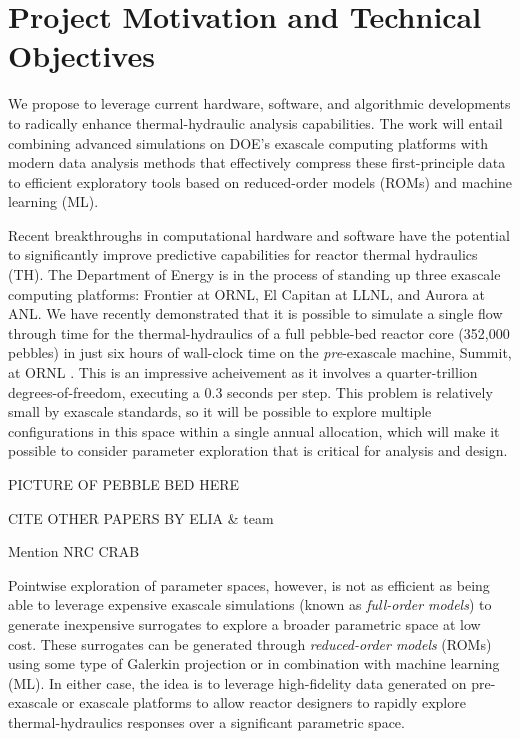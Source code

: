 \section{Project Motivation and Technical Objectives}

We propose to leverage current hardware, software, and algorithmic developments
to radically enhance thermal-hydraulic analysis capabilities.  The work will
entail combining advanced simulations on DOE's exascale computing platforms
with modern data analysis methods that effectively compress these
first-principle data to efficient exploratory tools based on reduced-order
models (ROMs) and machine learning (ML).

Recent breakthroughs in computational hardware and software have the potential
to significantly improve predictive capabilities for reactor thermal hydraulics
(TH).  The Department of Energy is in the process of standing up three exascale
computing platforms: Frontier at ORNL, El Capitan at LLNL, and Aurora at ANL.
We have recently demonstrated that it is possible to simulate a single flow
through time for the thermal-hydraulics of a full pebble-bed reactor core
(352,000 pebbles) in just six hours of wall-clock time on the {\em
pre}-exascale machine, Summit, at ORNL \cite{sc22}.   This is an impressive
acheivement as it involves a quarter-trillion degrees-of-freedom, executing a
0.3 seconds per step.  This problem is relatively small by exascale standards,
so it will be possible to explore multiple configurations in this space within
a single annual allocation, which will make it possible to consider parameter
exploration that is critical for analysis and design.

PICTURE OF PEBBLE BED HERE

CITE OTHER PAPERS BY ELIA \& team

Mention NRC CRAB

Pointwise exploration of parameter spaces, however, is not as efficient as being
able to leverage expensive exascale simulations (known as {\em full-order
models}) to generate inexpensive surrogates to explore a broader parametric
space at low cost.    These surrogates can be generated through {\em reduced-order
models} (ROMs) using some type of Galerkin projection or in combination with
machine learning (ML).   In either case, the idea is to leverage high-fidelity
data generated on pre-exascale or exascale platforms to allow reactor designers
to rapidly explore thermal-hydraulics responses over a significant parametric
space.

